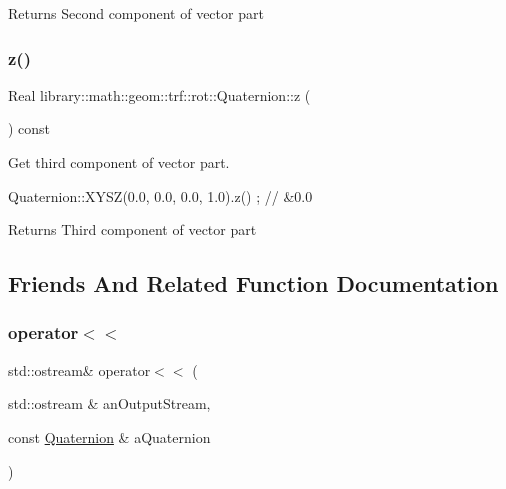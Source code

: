 \begin{DoxyReturn}{Returns}
Second component of vector part 
\end{DoxyReturn}
\mbox{\label{classlibrary_1_1math_1_1geom_1_1trf_1_1rot_1_1_quaternion_aaf9021e33aad157bf1444485fb486513}} 
\subsubsection{\texorpdfstring{z()}{z()}}
{\footnotesize\ttfamily Real library\+::math\+::geom\+::trf\+::rot\+::\+Quaternion\+::z (\begin{DoxyParamCaption}{ }\end{DoxyParamCaption}) const}



Get third component of vector part. 


\begin{DoxyCode}
Quaternion::XYSZ(0.0, 0.0, 0.0, 1.0).z() ; \textcolor{comment}{// &0.0}
\end{DoxyCode}


\begin{DoxyReturn}{Returns}
Third component of vector part 
\end{DoxyReturn}


\subsection{Friends And Related Function Documentation}
\mbox{\label{classlibrary_1_1math_1_1geom_1_1trf_1_1rot_1_1_quaternion_ab9414dc117f260055d0a1a565eb93708}} 
\subsubsection{\texorpdfstring{operator$<$$<$}{operator<<}}
{\footnotesize\ttfamily std\+::ostream\& operator$<$$<$ (\begin{DoxyParamCaption}\item[{std\+::ostream \&}]{an\+Output\+Stream,  }\item[{const \hyperlink{classlibrary_1_1math_1_1geom_1_1trf_1_1rot_1_1_quaternion}{Quaternion} \&}]{a\+Quaternion }\end{DoxyParamCaption})\hspace{0.3cm}{\ttfamily [friend]}}



